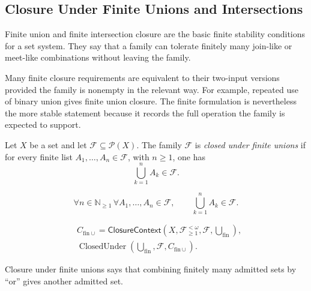 \subsection{Closure Under Finite Unions and Intersections}

\begin{remark*}[Exposition]
Finite union and finite intersection closure are the basic finite stability
conditions for a set system.  They say that a family can tolerate finitely
many join-like or meet-like combinations without leaving the family.
\end{remark*}

\begin{remark*}[Exposition]
Many finite closure requirements are equivalent to their two-input versions
provided the family is nonempty in the relevant way.  For example, repeated
use of binary union gives finite union closure.  The finite formulation is
nevertheless the more stable statement because it records the full operation
the family is expected to support.
\end{remark*}

\begin{definition}\label{def:closed-under-finite-unions}
Let \(X\) be a set and let \(\mathcal{F}\subseteq\mathcal{P}(X)\).  The family
\(\mathcal{F}\) is \emph{closed under finite unions} if for every finite list
\(A_1,\dots,A_n\in\mathcal{F}\), with \(n\geq 1\), one has
\[
  \bigcup_{k=1}^{n} A_k \in \mathcal{F}.
\]
\end{definition}

\begin{remark*}
\[
  \forall n\in\mathbb{N}_{\geq 1}\,
  \forall A_1,\dots,A_n\in\mathcal{F},\qquad
  \bigcup_{k=1}^{n}A_k\in\mathcal{F}.
\]
\end{remark*}

\begin{remark*}
\[
\begin{aligned}
&C_{\mathrm{fin}\cup}
=\mathsf{ClosureContext}(X,\mathcal{F}^{<\omega}_{\geq 1},\mathcal{F},\bigcup_{\mathrm{fin}}),\\
&\operatorname{ClosedUnder}(\bigcup_{\mathrm{fin}},\mathcal{F},C_{\mathrm{fin}\cup}).
\end{aligned}
\]
\end{remark*}

\begin{remark*}[Interpretation]
Closure under finite unions says that combining finitely many admitted sets by
``or'' gives another admitted set.
\end{remark*}

